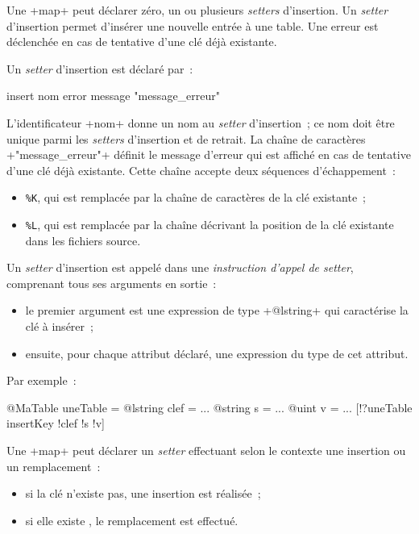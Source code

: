 
Une \ggst+map+ peut déclarer zéro, un ou plusieurs \emph{setters} d'insertion. Un \emph{setter} d'insertion permet d'insérer une nouvelle entrée à une table. Une erreur est déclenchée en cas de tentative d'une clé déjà existante.


Un \emph{setter} d'insertion est déclaré par~:

\begin{galgas3}
insert nom error message "message_erreur"
\end{galgas3}

L'identificateur \ggst+nom+ donne un nom au \emph{setter} d'insertion~; ce nom doit être unique parmi les \emph{setters} d'insertion et de retrait. La chaîne de caractères \ggst+"message_erreur"+ définit le message d'erreur qui est affiché en cas de tentative d'une clé déjà existante. Cette chaîne accepte deux séquences d'échappement~:
\begin{itemize}
  \item \texttt{\%K}, qui est remplacée par la chaîne de caractères de la clé existante~;
  \item \texttt{\%L}, qui est remplacée par la chaîne décrivant la position de la clé existante dans les fichiers source.
\end{itemize}


Un \emph{setter} d'insertion est appelé dans une \emph{instruction d'appel de setter}, comprenant tous ses arguments en sortie~:
\begin{itemize}
  \item le premier argument est une expression de type \ggst+@lstring+ qui caractérise la clé à insérer~;
  \item ensuite, pour chaque attribut déclaré, une expression du type de cet attribut.
\end{itemize}

Par exemple~:
\begin{galgas3}
@MaTable uneTable = {}
@lstring clef = ...
@string s = ...
@uint v = ...
[!?uneTable insertKey !clef !s !v]
\end{galgas3}




Une \ggst+map+ peut déclarer un \emph{setter} effectuant selon le contexte une insertion ou un remplacement~:
\begin{itemize}
  \item si la clé n'existe pas, une insertion est réalisée~;
  \item si elle existe , le remplacement est effectué.
\end{itemize}

